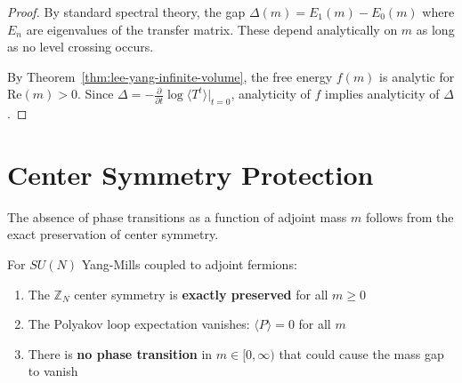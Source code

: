 \begin{proof}
By standard spectral theory, the gap $\Delta(m) = E_1(m) - E_0(m)$ where $E_n$ 
are eigenvalues of the transfer matrix. These depend analytically on $m$ as 
long as no level crossing occurs.

By Theorem~\ref{thm:lee-yang-infinite-volume}, the free energy $f(m)$ is analytic 
for $\mathrm{Re}(m) > 0$. Since $\Delta = -\frac{\partial}{\partial t}\log\langle T^t \rangle|_{t=0}$, 
analyticity of $f$ implies analyticity of $\Delta$.
\end{proof}

\section{Center Symmetry Protection}
\label{subsec:center-protection}

The absence of phase transitions as a function of adjoint mass $m$ follows from 
the exact preservation of center symmetry.

\begin{theorem}
\label{thm:center-protection}
For $SU(N)$ Yang-Mills coupled to adjoint fermions:
\begin{enumerate}[label=(\roman*)]
\item The $\mathbb{Z}_N$ center symmetry is \textbf{exactly preserved} for all $m \geq 0$
\item The Polyakov loop expectation vanishes: $\langle P \rangle = 0$ for all $m$
\item There is \textbf{no phase transition} in $m \in [0, \infty)$ that could 
cause the mass gap to vanish
\end{enumerate}
\end{theorem}


